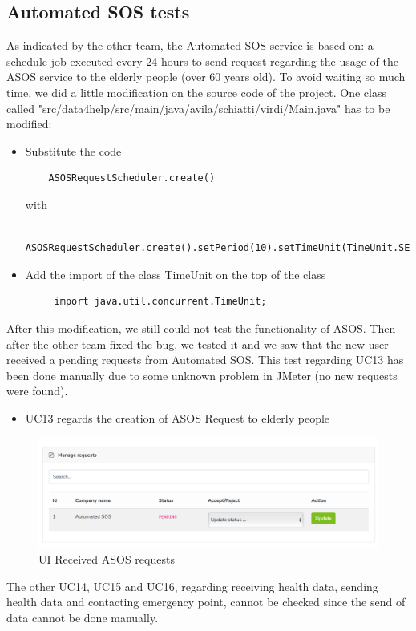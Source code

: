 \subsection{Automated SOS tests}
As indicated by the other team, the Automated SOS service is based on: a schedule job executed every 24 hours to send request regarding the usage of the ASOS service to the elderly people (over 60 years old). To avoid waiting so much time, we did a little modification on the source code of the project. One class called "src/data4help/src/main/java/avila/schiatti/virdi/Main.java" has to be modified:
\begin{itemize}
\item Substitute the code
\begin{verbatim}
	ASOSRequestScheduler.create()
\end{verbatim}
with
\begin{verbatim}
	ASOSRequestScheduler.create().setPeriod(10).setTimeUnit(TimeUnit.SECONDS)
\end{verbatim}
\item Add the import of the class TimeUnit on the top of the class
\begin{verbatim}
	 import java.util.concurrent.TimeUnit;
\end{verbatim}
\end{itemize}
After this modification, we still could not test the functionality of ASOS. Then after the other team fixed the bug, we tested it and we saw that the new user received a pending requests from Automated SOS. This test regarding UC13 has been done manually due to some unknown problem in JMeter (no new requests were found). 
\begin{itemize}
\item UC13 regards the creation of ASOS Request to elderly people
\end{itemize}

\begin{figure}[H]
\includegraphics[width=\linewidth]{images/pendingASOS}
\caption{ UI Received ASOS requests }
\label{fig:asosrequest}
\end{figure}

The other UC14, UC15 and UC16, regarding receiving health data, sending health data and contacting emergency point, cannot be checked since the send of data cannot be done manually.
